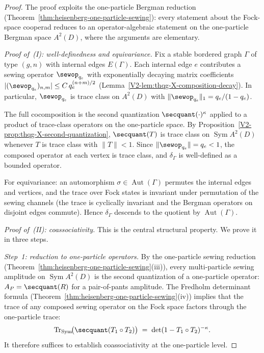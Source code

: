\begin{proof}
The proof exploits the one-particle Bergman reduction
(Theorem~\ref{thm:heisenberg-one-particle-sewing}): every statement
about the Fock-space cooperad reduces to an operator-algebraic
statement on the one-particle Bergman space $A^2(D)$, where the
arguments are elementary.

\medskip\noindent
\textit{Proof of~\textup{(I)}: well-definedness and equivariance.}
Fix a stable bordered graph $\Gamma$ of type $(g,n)$ with internal
edges $E(\Gamma)$. Each internal edge $e$ contributes a sewing
operator $\sewop_{q_e}$ with exponentially decaying matrix
coefficients $|(\sewop_{q_e})_{n,m}| \leq C\,q_e^{(n+m)/2}$
(Lemma~\ref{V2-lem:thqg-X-composition-decay}). In particular,
$\sewop_{q_e}$ is trace class on $A^2(D)$ with
$\|\sewop_{q_e}\|_1 = q_e/(1-q_e)$.

The full cocomposition is the second quantization
$\secquant(\cdot)^\kappa$ applied to a product of trace-class
operators on the one-particle space. By
Proposition~\ref{V2-prop:thqg-X-second-quantization}, $\secquant(T)$ is
trace class on $\operatorname{Sym} A^2(D)$ whenever $T$ is trace
class with $\|T\| < 1$. Since $\|\sewop_{q_e}\| = q_e < 1$, the
composed operator at each vertex is trace class, and $\delta_\Gamma$
is well-defined as a bounded operator.

For equivariance: an automorphism
$\sigma \in \operatorname{Aut}(\Gamma)$ permutes the internal edges
and vertices, and the trace over Fock states is invariant under
permutation of the sewing channels (the trace is cyclically invariant
and the Bergman operators on disjoint edges commute). Hence
$\delta_\Gamma$ descends to the quotient by
$\operatorname{Aut}(\Gamma)$.

\medskip\noindent
\textit{Proof of~\textup{(II)}: coassociativity.}
This is the central structural property. We prove it in three
steps.

\emph{Step~1: reduction to one-particle operators.}
By the one-particle sewing reduction
(Theorem~\ref{thm:heisenberg-one-particle-sewing}(iii)), every
multi-particle sewing amplitude on $\operatorname{Sym} A^2(D)$ is
the second quantization of a one-particle operator:
$A_P = \secquant(R)$ for a pair-of-pants amplitude. The Fredholm
determinant formula
(Theorem~\ref{thm:heisenberg-one-particle-sewing}(iv))
implies that the trace of any composed sewing operator on the Fock
space factors through the one-particle trace:
\begin{equation}\label{eq:heisenberg-one-particle-factorization}
\operatorname{Tr}_{\mathrm{Sym}}\!\bigl(
\secquant(T_1 \circ T_2)\bigr)
\;=\;
\det(1 - T_1 \circ T_2)^{-\kappa}.
\end{equation}
It therefore suffices to establish coassociativity at the one-particle
level.


\end{proof}
